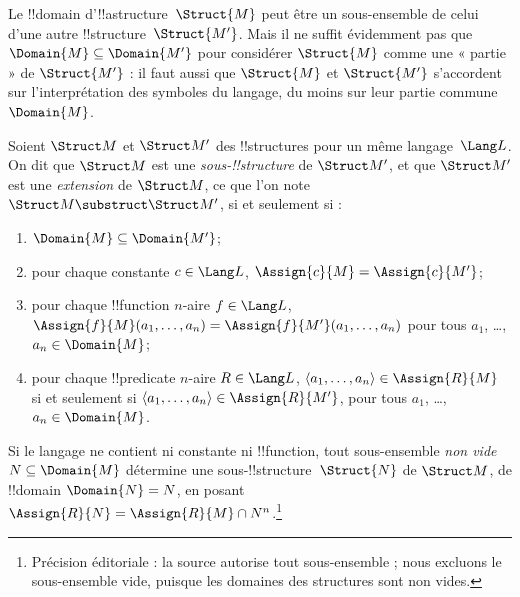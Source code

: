 \documentclass[../../../include/open-logic-section]{subfiles}
\begin{document}

Le !!{domain} d'!!a{structure}~$\Struct{M}$ peut être un sous-ensemble
de celui d'une autre !!{structure}~$\Struct{M'}$. Mais il ne suffit
évidemment pas que $\Domain{M} \subseteq \Domain{M'}$ pour considérer
$\Struct{M}$ comme une « partie » de $\Struct{M'}$ : il faut aussi que
$\Struct{M}$ et $\Struct{M'}$ s'accordent sur l'interprétation des
symboles du langage, du moins sur leur partie commune~$\Domain{M}$.

\begin{defn}
Soient $\Struct M$ et $\Struct M'$ des !!{structure}s pour un même
langage~$\Lang L$. On dit que $\Struct M$ est une
\emph{sous-!!{structure}} de $\Struct M'$, et que $\Struct M'$ est une
\emph{extension} de $\Struct M$, ce que l'on note
$\Struct M \substruct \Struct M'$, si et seulement si :
\begin{enumerate}
\item $\Domain{M} \subseteq \Domain{M'}$;
\item pour chaque constante $c \in \Lang L$, $\Assign{c}{M} =
    \Assign{c}{M'}$;
\item pour chaque !!{function} $n$-aire $f \in \Lang L$,
  $\Assign{f}{M}(a_1, \dots, a_n) = \Assign{f}{M'}(a_1, \dots, a_n)$
  pour tous $a_1$, \dots, $a_n \in \Domain{M}$;
\item pour chaque !!{predicate} $n$-aire $R \in \Lang L$,
  $\langle a_1, \dots, a_n\rangle \in \Assign{R}{M}$ si et seulement
  si $\langle a_1, \dots, a_n\rangle \in \Assign{R}{M'}$, pour tous
  $a_1$, \dots, $a_n \in \Domain{M}$.
\end{enumerate}
\end{defn}

\begin{rem}
Si le langage ne contient ni constante ni !!{function}, tout
sous-ensemble \emph{non vide} $N \subseteq \Domain{M}$ détermine une
sous-!!{structure}~$\Struct{N}$ de $\Struct M$, de !!{domain}
$\Domain{N} = N$, en posant $\Assign{R}{N} = \Assign{R}{M} \cap N^n$.\footnote{Précision éditoriale : la source autorise tout sous-ensemble ; nous excluons le sous-ensemble vide, puisque les domaines des structures sont non vides.}
\end{rem}

\end{document}
